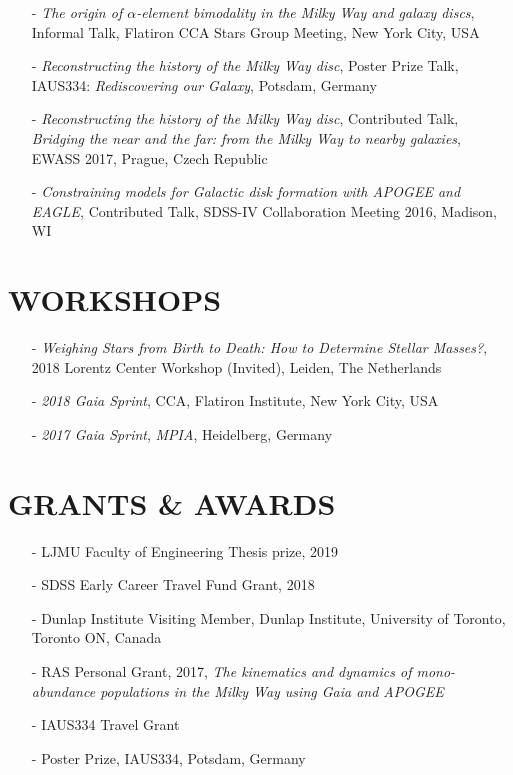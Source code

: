 \documentclass[margin]{res}
\begin{document}
\begin{resume}
\begin{itemize}
\item[-] \emph{The origin of $\alpha$-element bimodality in the Milky Way and galaxy discs}, Informal Talk, Flatiron CCA Stars Group Meeting, New York City, USA
\item[-] \emph{Reconstructing the history of the Milky Way disc}, Poster Prize Talk, IAUS334: \emph{Rediscovering our Galaxy}, Potsdam, Germany
\item[-] \emph{Reconstructing the history of the Milky Way disc}, Contributed Talk, \emph{Bridging the near and the far: from the Milky Way to nearby galaxies}, EWASS 2017, Prague, Czech Republic
\item[-] \emph{Constraining models for Galactic disk formation with APOGEE and EAGLE}, Contributed Talk, SDSS-IV Collaboration Meeting 2016, Madison, WI
\end{itemize}

\section{WORKSHOPS}
\begin{itemize}
\item[-] \emph{Weighing Stars from Birth to Death: How to Determine Stellar Masses?}, 2018 Lorentz Center Workshop (Invited), Leiden, The Netherlands
\item[-] \emph{2018 \emph{Gaia} Sprint}, CCA, Flatiron Institute, New York City, USA
\item[-] \emph{2017 \emph{Gaia} Sprint}, \emph{MPIA}, Heidelberg, Germany
\end{itemize}

\section{GRANTS \& AWARDS}
\begin{itemize}
\item[-] LJMU Faculty of Engineering Thesis prize, 2019
\item[-] SDSS Early Career Travel Fund Grant, 2018
\item[-] Dunlap Institute Visiting Member, Dunlap Institute, University of Toronto, Toronto ON, Canada
\item[-] RAS Personal Grant, 2017, \emph{The kinematics and dynamics of mono-abundance populations in the Milky Way using Gaia and APOGEE}
\item[-] IAUS334 Travel Grant
\item[-] Poster Prize, IAUS334, Potsdam, Germany
\end{itemize}


\end{resume}
\end{document}

